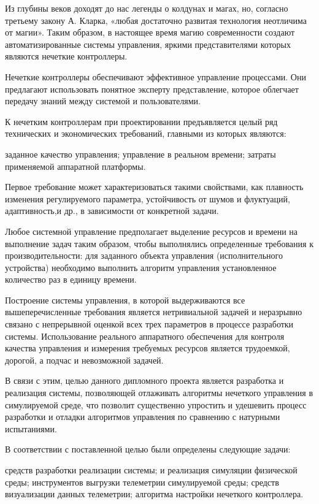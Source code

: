 %


Из глубины веков доходят до нас легенды о колдунах и магах, но, согласно третьему закону А. Кларка, «любая достаточно развитая технология неотличима от магии». Таким образом, в настоящее время магию современности создают автоматизированные системы управления, яркими представителями которых являются нечеткие контроллеры.

Нечеткие контроллеры обеспечивают эффективное управление процессами. Они предлагают использовать понятное эксперту представление, которое облегчает передачу знаний между системой и пользователями.

К нечетким контроллерам при проектировании предъявляется целый ряд технических и экономических требований, главными из которых являются:

\begin{itemize}
   заданное качество управления;
   управление в реальном времени; 
   затраты применяемой аппаратной платформы.
\end{itemize}

Первое требование может характеризоваться такими свойствами, как плавность изменения регулируемого параметра, устойчивость от шумов и флуктуаций, адаптивность,и др., в зависимости от конкретной задачи.

Любое системной управление предполагает выделение ресурсов и времени на выполнение задач таким образом, чтобы выполнялись определенные требования к производительности: для заданного объекта управления (исполнительного устройства) необходимо выполнить алгоритм управления установленное количество раз в единицу времени. 

Построение системы управления, в которой выдерживаются все вышеперечисленные требования является нетривиальной задачей и неразрывно связано с непрерывной оценкой всех трех параметров в процессе разработки системы. Использование реального аппаратного обеспечения для контроля качества управления и измерения требуемых ресурсов является трудоемкой, дорогой, а подчас и невозможной задачей.

В связи с этим, целью данного дипломного проекта является разработка и реализация системы, позволяющей отлаживать алгоритмы нечеткого управления в симулируемой среде, что позволит существенно упростить и удешевить процесс разработки и отладки алгоритмов управления по сравнению с натурными испытаниями.	

В соответствии с поставленной целью были определены следующие задачи:

\begin{itemize}
   средств разработки реализации системы;
   и реализация симуляции физической среды;
   инструментов выгрузки телеметрии симулируемой среды;
   средств визуализации данных телеметрии;
   алгоритма настройки нечеткого контроллера.
\end{itemize}